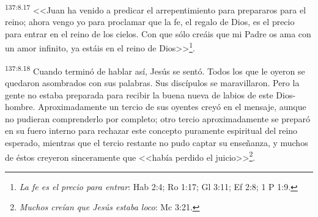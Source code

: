 \par 
\textsuperscript{137:8.17} <<Juan ha venido a predicar el arrepentimiento para prepararos para el reino; ahora vengo yo para proclamar que la fe, el regalo de Dios, es el precio para entrar en el reino de los cielos. Con que sólo creáis que mi Padre os ama con un amor infinito, ya estáis en el reino de Dios>>\footnote{\textit{La fe es el precio para entrar}: Hab 2:4; Ro 1:17; Gl 3:11; Ef 2:8; 1 P 1:9.}.

\par 
\textsuperscript{137:8.18} Cuando terminó de hablar así, Jesús se sentó. Todos los que le oyeron se quedaron asombrados con sus palabras. Sus discípulos se maravillaron. Pero la gente no estaba preparada para recibir la buena nueva de labios de este Dios-hombre. Aproximadamente un tercio de sus oyentes creyó en el mensaje, aunque no pudieran comprenderlo por completo; otro tercio aproximadamente se preparó en su fuero interno para rechazar este concepto puramente espiritual del reino esperado, mientras que el tercio restante no pudo captar su enseñanza, y muchos de éstos creyeron sinceramente que <<había perdido el juicio>>\footnote{\textit{Muchos creían que Jesús estaba loco}: Mc 3:21.}.